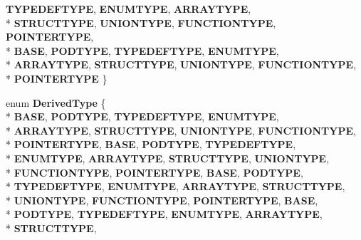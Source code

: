 \begin{DoxyCompactItemize}
{\bfseries T\-Y\-P\-E\-D\-E\-F\-T\-Y\-P\-E}, 
{\bfseries E\-N\-U\-M\-T\-Y\-P\-E}, 
{\bfseries A\-R\-R\-A\-Y\-T\-Y\-P\-E}, 
\\*
{\bfseries S\-T\-R\-U\-C\-T\-T\-Y\-P\-E}, 
{\bfseries U\-N\-I\-O\-N\-T\-Y\-P\-E}, 
{\bfseries F\-U\-N\-C\-T\-I\-O\-N\-T\-Y\-P\-E}, 
{\bfseries P\-O\-I\-N\-T\-E\-R\-T\-Y\-P\-E}, 
\\*
{\bfseries B\-A\-S\-E}, 
{\bfseries P\-O\-D\-T\-Y\-P\-E}, 
{\bfseries T\-Y\-P\-E\-D\-E\-F\-T\-Y\-P\-E}, 
{\bfseries E\-N\-U\-M\-T\-Y\-P\-E}, 
\\*
{\bfseries A\-R\-R\-A\-Y\-T\-Y\-P\-E}, 
{\bfseries S\-T\-R\-U\-C\-T\-T\-Y\-P\-E}, 
{\bfseries U\-N\-I\-O\-N\-T\-Y\-P\-E}, 
{\bfseries F\-U\-N\-C\-T\-I\-O\-N\-T\-Y\-P\-E}, 
\\*
{\bfseries P\-O\-I\-N\-T\-E\-R\-T\-Y\-P\-E}
 \}
\item 
enum {\bfseries Derived\-Type} \{ \\*
{\bfseries B\-A\-S\-E}, 
{\bfseries P\-O\-D\-T\-Y\-P\-E}, 
{\bfseries T\-Y\-P\-E\-D\-E\-F\-T\-Y\-P\-E}, 
{\bfseries E\-N\-U\-M\-T\-Y\-P\-E}, 
\\*
{\bfseries A\-R\-R\-A\-Y\-T\-Y\-P\-E}, 
{\bfseries S\-T\-R\-U\-C\-T\-T\-Y\-P\-E}, 
{\bfseries U\-N\-I\-O\-N\-T\-Y\-P\-E}, 
{\bfseries F\-U\-N\-C\-T\-I\-O\-N\-T\-Y\-P\-E}, 
\\*
{\bfseries P\-O\-I\-N\-T\-E\-R\-T\-Y\-P\-E}, 
{\bfseries B\-A\-S\-E}, 
{\bfseries P\-O\-D\-T\-Y\-P\-E}, 
{\bfseries T\-Y\-P\-E\-D\-E\-F\-T\-Y\-P\-E}, 
\\*
{\bfseries E\-N\-U\-M\-T\-Y\-P\-E}, 
{\bfseries A\-R\-R\-A\-Y\-T\-Y\-P\-E}, 
{\bfseries S\-T\-R\-U\-C\-T\-T\-Y\-P\-E}, 
{\bfseries U\-N\-I\-O\-N\-T\-Y\-P\-E}, 
\\*
{\bfseries F\-U\-N\-C\-T\-I\-O\-N\-T\-Y\-P\-E}, 
{\bfseries P\-O\-I\-N\-T\-E\-R\-T\-Y\-P\-E}, 
{\bfseries B\-A\-S\-E}, 
{\bfseries P\-O\-D\-T\-Y\-P\-E}, 
\\*
{\bfseries T\-Y\-P\-E\-D\-E\-F\-T\-Y\-P\-E}, 
{\bfseries E\-N\-U\-M\-T\-Y\-P\-E}, 
{\bfseries A\-R\-R\-A\-Y\-T\-Y\-P\-E}, 
{\bfseries S\-T\-R\-U\-C\-T\-T\-Y\-P\-E}, 
\\*
{\bfseries U\-N\-I\-O\-N\-T\-Y\-P\-E}, 
{\bfseries F\-U\-N\-C\-T\-I\-O\-N\-T\-Y\-P\-E}, 
{\bfseries P\-O\-I\-N\-T\-E\-R\-T\-Y\-P\-E}, 
{\bfseries B\-A\-S\-E}, 
\\*
{\bfseries P\-O\-D\-T\-Y\-P\-E}, 
{\bfseries T\-Y\-P\-E\-D\-E\-F\-T\-Y\-P\-E}, 
{\bfseries E\-N\-U\-M\-T\-Y\-P\-E}, 
{\bfseries A\-R\-R\-A\-Y\-T\-Y\-P\-E}, 
\\*
{\bfseries S\-T\-R\-U\-C\-T\-T\-Y\-P\-E}, 

\end{DoxyCompactItemize}
